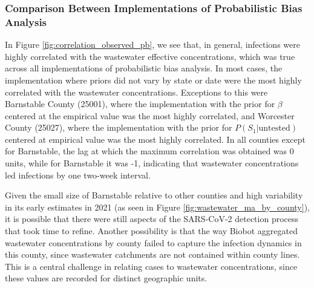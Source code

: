 \documentclass[12pt,twoside]{smiththesis}
\begin{document}
\hypertarget{comparison-between-implementations-of-probabilistic-bias-analysis}{%
\subsubsection{Comparison Between Implementations of Probabilistic Bias Analysis}\label{comparison-between-implementations-of-probabilistic-bias-analysis}}

In Figure \ref{fig:correlation_observed_pb}, we see that, in general, infections were highly correlated with the wastewater effective concentrations, which was true across all implementations of probabilistic bias analysis. In most cases, the implementation where priors did not vary by state or date were the most highly correlated with the wastewater concentrations. Exceptions to this were Barnstable County (25001), where the implementation with the prior for \(\beta\) centered at the empirical value was the most highly correlated, and Worcester County (25027), where the implementation with the prior for \(P(S_1|\text{untested})\) centered at empirical value was the most highly correlated. In all counties except for Barnstable, the lag at which the maximum correlation was obtained was 0 units, while for Barnstable it was -1, indicating that wastewater concentrations led infections by one two-week interval.

Given the small size of Barnstable relative to other counties and high variability in its early estimates in 2021 (as seen in Figure \ref{fig:wastewater_ma_by_county}), it is possible that there were still aspects of the SARS-CoV-2 detection process that took time to refine. Another possibility is that the way Biobot aggregated wastewater concentrations by county failed to capture the infection dynamics in this county, since wastewater catchments are not contained within county lines. This is a central challenge in relating cases to wastewater concentrations, since these values are recorded for distinct geographic units.
\end{document}
